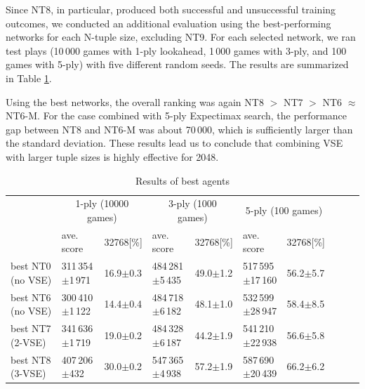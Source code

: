 Since NT8, in particular, produced both successful and unsuccessful training outcomes, we conducted an additional evaluation using the best-performing networks for each N-tuple size, excluding NT9.
For each selected network, we ran test plays (10\,000 games with 1-ply lookahead, 1\,000 games with 3-ply, and 100 games with 5-ply) with five different random seeds.
The results are summarized in Table \ref{table:exp4}.

Using the best networks, the overall ranking was again NT8 $>$ NT7 $>$ NT6 $\approx$ NT6-M.
For the case combined with 5-ply Expectimax search, the performance gap between NT8 and NT6-M was about 70\,000, which is sufficiently larger than the standard deviation.
These results lead us to conclude that combining VSE with larger tuple sizes is highly effective for 2048.

\begin{table}
 \caption{Results of best agents}
 \label{table:exp4}
 \small\begin{tabular}{l|l|l|l|l|l|l|l|l|l}
  \hline \hline
  & \multicolumn{2}{c}{1-ply (10000 games)} & \multicolumn{2}{c}{3-ply (1000 games)} & \multicolumn{2}{c}{5-ply (100 games)} \\
  & ave. score & 32768[\%] & ave. score & 32768[\%] & ave. score & 32768[\%] \\
  \hline
   best NT0 (no VSE)	& 311\,354$\pm$1\,971		& 16.9$\pm$0.3	& 484\,281$\pm$5\,435	& 49.0$\pm$1.2	& 517\,595$\pm$17\,160	& 56.2$\pm$5.7 \\\hline
   best NT6 (no VSE)	& 300\,410$\pm$1\,122		& 14.4$\pm$0.4	& 484\,718$\pm$6\,182	& 48.1$\pm$1.0	& 532\,599$\pm$28\,947	& 58.4$\pm$8.5 \\\hline
   best NT7 (2-VSE)	& 341\,636$\pm$1\,719		& 19.0$\pm$0.2	& 484\,328$\pm$6\,187	& 44.2$\pm$1.9	& 541\,210$\pm$22\,938	& 56.6$\pm$5.8 \\\hline
   best NT8 (3-VSE)	& 407\,206$\pm$\phantom{1\,}432 & 30.0$\pm$0.2	& 547\,365$\pm$4\,938	& 57.2$\pm$1.9	& 587\,690$\pm$20\,439	& 66.2$\pm$6.2 \\\hline
 \end{tabular}
\end{table}

